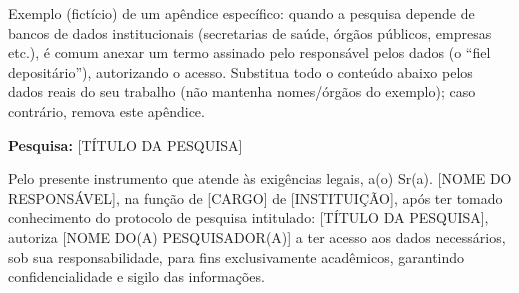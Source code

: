 \label{ap:termo-de-fiel-depositario}

Exemplo (fictício) de um apêndice específico: quando a pesquisa depende de bancos de dados institucionais (secretarias de saúde, órgãos públicos, empresas etc.), é comum anexar um termo assinado pelo responsável pelos dados (o ``fiel depositário''), autorizando o acesso. Substitua todo o conteúdo abaixo pelos dados reais do seu trabalho (não mantenha nomes/órgãos do exemplo); caso contrário, remova este apêndice.

\noindent \textbf{Pesquisa:} [TÍTULO DA PESQUISA]

\noindent Pelo presente instrumento que atende às exigências legais, a(o) Sr(a). [NOME DO RESPONSÁVEL], na função de [CARGO] de [INSTITUIÇÃO], após ter tomado conhecimento do protocolo de pesquisa intitulado: [TÍTULO DA PESQUISA], autoriza [NOME DO(A) PESQUISADOR(A)] a ter acesso aos dados necessários, sob sua responsabilidade, para fins exclusivamente acadêmicos, garantindo confidencialidade e sigilo das informações.